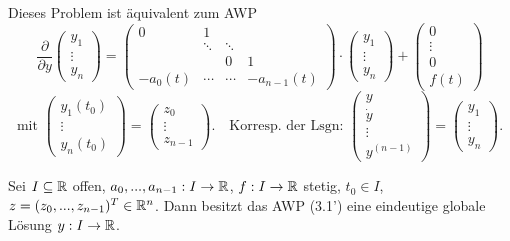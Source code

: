 \documentclass{cheat-sheet}
\begin{document}
\begin{bem}
  Dieses Problem ist äquivalent zum AWP
  \[
    \frac{\partial}{\partial y} \begin{pmatrix}
      y_1 \\ \vdots \\ y_n
    \end{pmatrix} = \begin{pmatrix}
      0 & 1 && \\
      & \ddots & \ddots & \\
      && 0 & 1\\
      - a_0(t) & \cdots & \cdots & -a_{n-1}(t)
    \end{pmatrix} \cdot \begin{pmatrix}
      y_1 \\ \vdots \\ y_n
    \end{pmatrix} + \begin{pmatrix}
      0 \\ \vdots \\ 0 \\ f(t)
    \end{pmatrix}
  \]
  \[
    \text{mit } \begin{pmatrix}
      y_1(t_0) \\ \vdots \\ y_n(t_0)
    \end{pmatrix} = \begin{pmatrix}
      z_0 \\ \vdots \\ z_{n-1}
    \end{pmatrix}.
    \quad \text{Korresp. der Lsgn: }
    \begin{pmatrix}
      y \\ \dot{y} \\ \vdots \\ y^{(n-1)}
    \end{pmatrix} = \begin{pmatrix}
      y_1 \\ \vdots \\ y_n
    \end{pmatrix}.
  \]
\end{bem}

\begin{satz}
  Sei $I \subseteq \mathbb{R}$ offen, $a_0, ..., a_{n-1} : I \to \mathbb{R}$, $f : I \to \mathbb{R}$ stetig, $t_0 \in I$, $z = (z_0, ..., z_{n-1})^T \in \mathbb{R}^n$. Dann besitzt das AWP (3.1') eine eindeutige globale Lösung $y : I \to \mathbb{R}$.
\end{satz}
\end{document}
